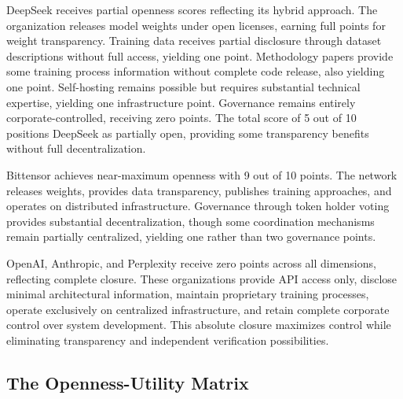 DeepSeek receives partial openness scores reflecting its hybrid approach. The organization releases model weights under open licenses, earning full points for weight transparency. Training data receives partial disclosure through dataset descriptions without full access, yielding one point. Methodology papers provide some training process information without complete code release, also yielding one point. Self-hosting remains possible but requires substantial technical expertise, yielding one infrastructure point. Governance remains entirely corporate-controlled, receiving zero points. The total score of 5 out of 10 positions DeepSeek as partially open, providing some transparency benefits without full decentralization.

Bittensor achieves near-maximum openness with 9 out of 10 points. The network releases weights, provides data transparency, publishes training approaches, and operates on distributed infrastructure. Governance through token holder voting provides substantial decentralization, though some coordination mechanisms remain partially centralized, yielding one rather than two governance points.

OpenAI, Anthropic, and Perplexity receive zero points across all dimensions, reflecting complete closure. These organizations provide API access only, disclose minimal architectural information, maintain proprietary training processes, operate exclusively on centralized infrastructure, and retain complete corporate control over system development. This absolute closure maximizes control while eliminating transparency and independent verification possibilities.

\subsection{The Openness-Utility Matrix}

